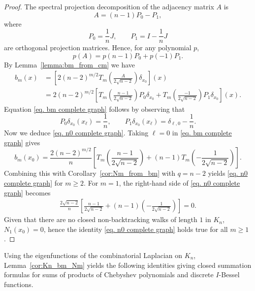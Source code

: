 \documentclass[reqno,10pt]{amsart}
\theoremstyle{definition}
\numberwithin{equation}{section}
\begin{document}
\begin{proof}
The spectral projection decomposition of the adjacency matrix $A$ is
\[
A=(n-1)P_0-P_1,
\]
where
\[
P_0=\frac1nJ,
\qquad
P_1=I-\frac1nJ
\]
are orthogonal projection matrices. Hence, for
any polynomial $p$,
\[
p(A)=p(n-1)P_0+p(-1)P_1.
\]
By Lemma~\ref{lemma:bm_from_cm} we have 
\begin{align*}
b_m(x)&=
\left[
2(n-2)^{m/2}T_m\!\left(\frac{A}{2\sqrt{n-2}} \right)\delta_{x_0}
\right](x)\\&=2(n-2)^{m/2}\left[
T_m\!\left(\frac{n-1}{2\sqrt{n-2}} \right)P_0\delta_{x_0} + T_m\!\left(\frac{-1}{2\sqrt{n-2}} \right)P_1\delta_{x_0}
\right](x).
\end{align*}
Equation \eqref{eq. bm complete graph} follows by observing that
\[
P_0\delta_{x_0}(x_\ell)=\frac1n,
\qquad
P_1\delta_{x_0}(x_\ell)=\delta_{\ell,0}-\frac1n.
\]
Now we deduce \eqref{eq. n0 complete graph}. Taking $\ell=0$ in \eqref{eq. bm complete graph} gives
\[
b_m(x_0)
=
\frac{2(n-2)^{m/2}}{n}
\left[
T_m\!\left(\frac{n-1}{2\sqrt{n-2}}\right)
+
(n-1)T_m\!\left(-\frac{1}{2\sqrt{n-2}}\right)
\right].
\]
Combining this with Corollary~\ref{cor:Nm_from_bm} with $q=n-2$ yields \eqref{eq. n0 complete graph} for $m\ge2$. For $m=1$, the right-hand side of \eqref{eq. n0 complete graph} becomes
\[
\begin{split}
\frac{2\sqrt{n-2}}{n}
\left[
\frac{n-1}{2\sqrt{n-2}}
+
(n-1)\left(-\frac{1}{2\sqrt{n-2}}\right)
\right]
=0.
\end{split}
\]
Given that there are no closed non-backtracking walks of
length $1$ in $K_n$, $N_1(x_0)=0$, hence the identity \eqref{eq. n0 complete graph} holds true for all $m\ge1$.
\end{proof}


Using the eigenfunctions of the combinatorial Laplacian on $K_n$, Lemma~\ref{cor:Kn_bm_Nm} yields the following identities giving closed summation formulas for sums of products of Chebyshev polynomials and discrete $I$-Bessel functions.
\end{document}
